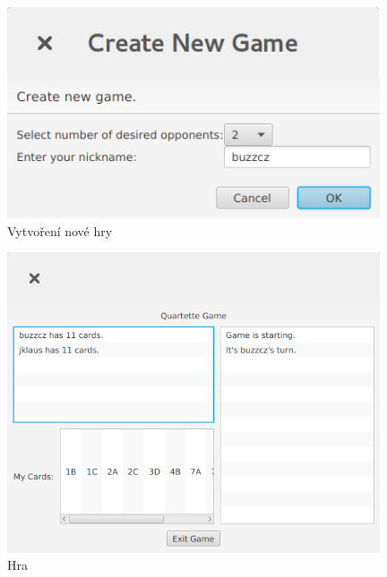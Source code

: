 \documentclass[12pt, a4paper]{article}
\begin{document}
	\begin{figure}[ht!]
		\centering
		\caption{Vytvoření nové hry}
		\label{NewGame}
		\includegraphics[width=11cm]{img/NewGame.png}
	\end{figure}
	\begin{figure}[ht!]
		\centering
		\caption{Hra}
		\label{Game}
		\includegraphics[width=11cm]{img/Game.png}
	\end{figure}
	
\end{document}
